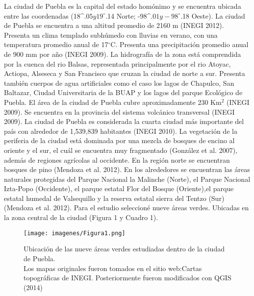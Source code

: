 \documentclass[letterpaper,12pt]{article}
\begin{document}
La ciudad de Puebla es la capital del estado homónimo y se encuentra ubicada entre las coordenadas 
(18^{\circ}$.05 y 19^{\circ}$.14 Norte; -98^{\circ}$.01 y -98^{\circ}$.18 Oeste). La ciudad de Puebla se encuentra a una altitud promedio  de 2160 m (INEGI 2012). Presenta un clima templado subhúmedo con lluvias en verano, con una  temperatura promedio anual de 17$^{\circ}$C. Presenta una precipitación promedio anual de 900 mm por año (INEGI 2009). La hidrografía de la zona está comprendida por la cuenca del rio Balsas, representada principalmente por el rio Atoyac, Actiopa, Alseseca y San Francisco que cruzan la ciudad de norte a sur. Presenta también cuerpos de agua artificiales como el caso los lagos de Chapulco, San Baltazar,  Ciudad Universitaria de la BUAP y los lagos del parque Ecológico de Puebla. El área de la ciudad de Puebla cubre aproximadamente 230 Km$^{2}$ (INEGI 2009). Se encuentra en la provincia del sistema volcánico transversal (INEGI 2009). La ciudad de Puebla es considerada la cuarta ciudad más importante del país con alrededor de 1,539,839 habitantes (INEGI 2010).
La vegetación de la periferia de la ciudad está dominada por una mezcla de bosques de encino al oriente y el sur, el cuál se encuentra muy fragmentado (González et al. 2007), además de regiones agrícolas al occidente. En la región norte se encuentran bosques de pino (Mendoza et al. 2012).
En los alrededores se encuentran las áreas naturales protegidas del Parque Nacional la Malinche (Norte), el Parque Nacional Izta-Popo (Occidente), el parque estatal Flor del Bosque (Oriente),el parque estatal humedal de Valsequillo y la reserva estatal sierra del Tentzo (Sur) (Mendoza et al. 2012). Para el estudio seleccioné nueve áreas verdes. Ubicadas en la zona central de la ciudad (Figura 1 y Cuadro 1).\\

\begin{center}
\begin{figure}[H]
\texttt{[image: imagenes/Figura1.png]}\\
\caption[Ubicación de las nueve áreas verdes.]{Ubicación de las nueve áreas verdes estudiadas dentro de la ciudad de Puebla.\\
Los mapas originales fueron tomados en el sitio web:Cartas topográficas de INEGI.  Posteriormente fueron modificados con QGIS (2014)}
\end{figure}
\end{center}
\end{document}
